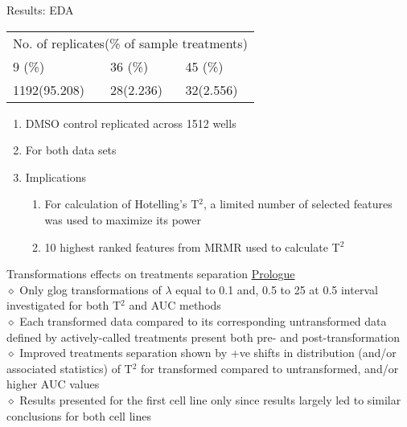 \documentclass[11pt]{beamer}
\begin{document}
\begin{frame}{Results:  EDA}
\begin{tabular}{ p{}  p{}  p{} }
\multicolumn{3}{l}{No. of replicates(\% of sample treatments)}\\   
9 (\%) & 36 (\%) & 45 (\%) \\ \hline
1192(95.208) & 28(2.236) & 32(2.556) \\
\end{tabular}
\vspace{3mm}
\begin{enumerate}[$\bigstar$]
\item DMSO control replicated across 1512 wells
\item For both data sets
\item Implications \\
\begin{enumerate}[$\star$]
\item For calculation of Hotelling's T$^2$, a limited number of selected features was used to maximize its power
\item 10 highest ranked features from MRMR used to calculate T$^2$
\end{enumerate}
\end{enumerate}
\end{frame}

\begin{frame}{Transformations effects on treatments separation}
\underline{Prologue} \\ \vspace{3mm}
$\diamond$ Only glog transformations of $\lambda$ equal to 0.1 and, 0.5 to 25 at 0.5 interval investigated for both T$^2$ and AUC methods \\ \vspace{3mm}
$\diamond$ Each transformed data compared to its corresponding untransformed data defined by actively-called treatments present both pre- and post-transformation \\ \vspace{3mm}
$\diamond$ Improved treatments separation shown by +ve shifts in distribution (and/or associated statistics) of T$^2$ for transformed compared to untransformed, and/or higher AUC values \\ \vspace{3mm}
$\diamond$ Results presented for the first cell line only since results largely led to similar conclusions for both cell lines
\end{frame}
\end{document}

